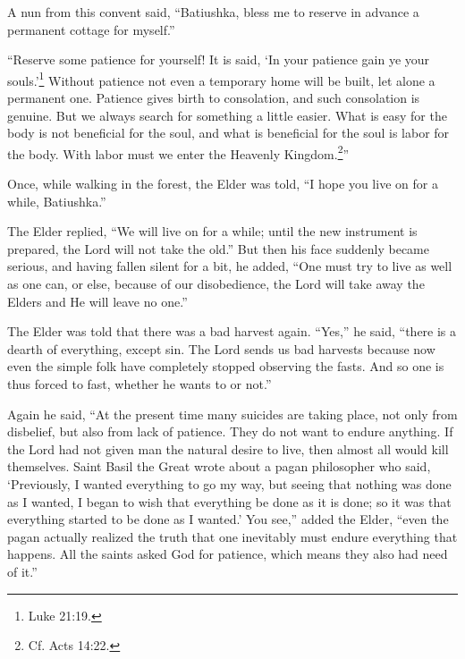A nun from this convent said, ``Batiushka, bless me to reserve in advance a permanent cottage for myself.''

``Reserve some patience for yourself! It is said, `In your patience gain ye your souls.'\footnote{Luke 21:19.} Without patience not even a temporary home will be built, let alone a permanent one. Patience gives birth to consolation, and such consolation is genuine. But we always search for something a little easier. What is easy for the body is not beneficial for the soul, and what is beneficial for the soul is labor for the body. With labor must we enter the Heavenly Kingdom.\footnote{Cf. Acts 14:22.}''

Once, while walking in the forest, the Elder was told, ``I hope you live on for a while, Batiushka.''

The Elder replied, ``We will live on for a while; until the new instrument is prepared, the Lord will not take the old.'' But then his face suddenly became serious, and having fallen silent for a bit, he added, ``One must try to live as well as one can, \label{ch5obedience}or else, because of our disobedience, the Lord will take away the Elders and He will leave no one.''

The Elder was told that there was a bad harvest again. ``Yes,'' he said, ``there is a dearth of everything, except sin. The Lord sends us bad harvests because now even the simple folk have completely stopped observing the fasts. And so one is thus forced to fast, whether he wants to or not.''

Again he said, ``At the present time many suicides are taking place, not only from disbelief, but also from lack of patience. They do not want to endure anything. If the Lord had not given man the natural desire to live, then almost all would kill themselves. Saint Basil the Great wrote about a pagan philosopher who said, `Previously, I wanted everything to go my way, but seeing that nothing was done as I wanted, I began to wish that everything be done as it is done; so it was that everything started to be done as I wanted.' You see,'' added the Elder, ``even the pagan actually realized the truth that one inevitably must endure everything that happens. All the saints asked God for patience, which means they also had need of it.''

